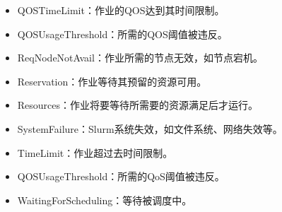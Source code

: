 \documentclass[a4paper,12pt,english]{sphinxmanual}
\begin{document}
\begin{itemize}
\begin{itemize}
\item {} 
\sphinxAtStartPar
QOSTimeLimit：作业的QOS达到其时间限制。

\item {} 
\sphinxAtStartPar
QOSUsageThreshold：所需的QOS阈值被违反。

\item {} 
\sphinxAtStartPar
ReqNodeNotAvail：作业所需的节点无效，如节点宕机。

\item {} 
\sphinxAtStartPar
Reservation：作业等待其预留的资源可用。

\item {} 
\sphinxAtStartPar
Resources：作业将要等待所需要的资源满足后才运行。

\item {} 
\sphinxAtStartPar
SystemFailure：Slurm系统失效，如文件系统、网络失效等。

\item {} 
\sphinxAtStartPar
TimeLimit：作业超过去时间限制。

\item {} 
\sphinxAtStartPar
QOSUsageThreshold：所需的QoS阈值被违反。

\item {} 
\sphinxAtStartPar
WaitingForScheduling：等待被调度中。

\end{itemize}

\end{itemize}
\end{document}
